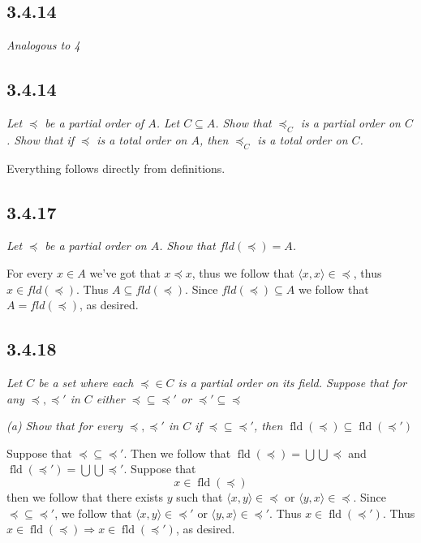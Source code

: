 \documentclass[11pt,oneside,titlepage]{book}
\DeclareMathOperator \fld {fld}
\DeclareMathOperator \ra {\Rightarrow}
\newcommand{\eangle}[1]{\langle #1 \rangle}
\begin{document}
\subsection*{3.4.14}

\textit{Analogous to 4}

\subsection*{3.4.14}

\textit{Let $\preceq$ be a partial order of $A$. Let $C \subseteq A$. Show that
  $\preceq_C$ is a partial order on $C$. Show that if $\preceq$ is a total order on $A$,
  then $\preceq_C$ is a total order on $C$.}

Everything follows directly from definitions.

\subsection*{3.4.17}

\textit{Let $\preceq$ be a partial order on $A$. Show that $fld(\preceq) = A$.}

For every $x \in A$ we've got that 
$x \preceq x$, thus we follow that $\eangle{x, x} \in \preceq$, thus $x \in fld(\preceq)$.
Thus $A \subseteq fld(\preceq)$. Since $fld(\preceq) \subseteq A$
we follow that $A = fld(\preceq)$, as desired.

\subsection*{3.4.18}

\textit{Let $C$ be a set where each $\preceq \in C$ is a partial order on its field.
  Suppose that for any $\preceq, \preceq'$ in $C$ either $\preceq \subseteq \preceq'$
  or $\preceq' \subseteq \preceq$}

\textit{(a) Show that for every $\preceq, \preceq'$ in $C$ if $\preceq \subseteq \preceq'$,
  then $\fld(\preceq) \subseteq \fld(\preceq')$}

Suppose that $\preceq \subseteq \preceq'$. Then we follow that
$\fld(\preceq) = \bigcup \bigcup \preceq$ and
$\fld(\preceq') = \bigcup \bigcup \preceq'$. Suppose that
$$x \in \fld(\preceq)$$
then we follow that there exists $y$ such that  $\eangle{x, y} \in \preceq$ or
$\eangle{y, x} \in \preceq$. Since $\preceq \subseteq \preceq'$, we follow
that $\eangle{x, y} \in \preceq'$ or $\eangle{y, x} \in \preceq'$. Thus
$x \in \fld(\preceq')$. Thus $x \in \fld(\preceq) \ra x \in \fld(\preceq')$,
as desired.
\end{document}
